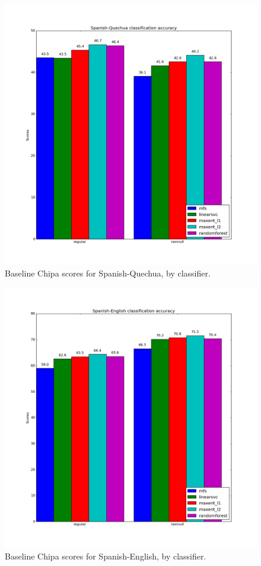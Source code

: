 \begin{figure}
  \includegraphics[width=\textwidth]{baseline-esqu-ch4.png}
  \caption{Baseline Chipa scores for Spanish-Quechua, by classifier.}
  \label{fig:esquresults:ch4}
\end{figure}

\begin{figure}
  \includegraphics[width=\textwidth]{baseline-esen-ch4.png}
  \caption{Baseline Chipa scores for Spanish-English, by classifier.}
  \label{fig:esenresults:ch4}
\end{figure}

